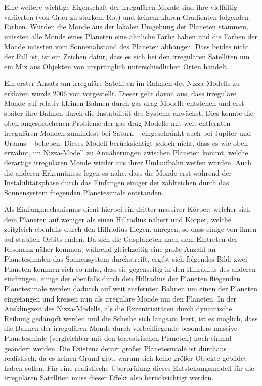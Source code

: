 \documentclass[12pt,a4paper,twoside]{article}
\renewcommand{\cite}{\citep}
\begin{document}
Eine weitere wichtige Eigenschaft der irregulären Monde sind ihre vielfältig variierten (von Grau zu starkem Rot) und keinem klaren Gradienten folgenden Farben. Würden die Monde aus der lokalen Umgebung der Planeten stammen, müssten alle Monde eines Planeten eine ähnliche Farbe haben und die Farben der Monde müssten vom Sonnenabstand des Planeten abhängen\cite{Degewij1980Icar,Cruikshank1980Icar,Dumas1998Icar, Sykes2000Icar,Brown2000AJ,Grav2003Icar,Grav2004ApJ,GravHolman2004ApJ,Porco2005Sci,Nesvorny2007}. Dass beides nicht der Fall ist, ist ein Zeichen dafür, dass es sich bei den irregulären Satelliten um ein Mix aus Objekten von ursprünglich unterschiedlichen Orten handelt.

Ein erster Ansatz um irreguläre Satelliten im Rahmen des Nizza-Modells zu erklären wurde 2006 von \cite{Cuk2006} vorgestellt. Dieser geht davon aus, dass irreguläre Monde auf relativ kleinen Bahnen durch \glqq gas-drag\grqq-Modelle entstehen und erst später ihre Bahnen durch die Instabilität des Systems anwächst. Dies konnte die oben angesprochenen Probleme der \glqq gas-drag\grqq-Modelle mit weit entfernten irregulären Monden zumindest bei Saturn – eingeschränkt auch bei Jupiter und Uranus – beheben\cite{Cuk2006}.
Dieses Modell berücksichtigt jedoch nicht, dass es wie oben erwähnt, im Nizza-Modell zu Annäherungen zwischen Planeten kommt, welche derartige irregulären Monde wieder aus ihrer Umlaufbahn werfen würden. Auch die anderen Erkenntnisse legen es nahe, dass die Monde erst während der Instabilitätsphase durch das Einfangen einiger der zahlreichen durch das Sonnensystem fliegenden Planetesimale entstanden.

Als Einfangmechanismus dient hierbei ein dritter massiver Körper,
welcher sich dem Planeten auf weniger als einen Hillradius nähert und Körper,
welche zeitgleich ebenfalls durch den Hillradius fliegen, anregen, so dass einige von ihnen auf stabilen Orbits enden.
Da sich die Gasplaneten nach dem Eintreten der Resonanz näher kommen, während gleichzeitig eine große Anzahl an Planetesimalen das Sonnensystem durchstreift,
ergibt sich folgendes Bild: zwei Planeten kommen sich so nahe, dass sie gegenseitig in den Hillradius des anderen eindringen,
einige der ebenfalls durch den Hillradius der Planeten fliegenden Planetesimale werden dadurch auf weit entfernten Bahnen um einen der Planeten eingefangen und kreisen nun als irreguläre Monde um den Planeten\cite{Nesvorny2007}.
In der Ausklingzeit des Nizza-Modells, als die Exzentrizitäten durch dynamische Reibung gedämpft werden und die Scheibe sich langsam leert, ist es möglich, dass die Bahnen der irregulären Monde durch vorbeifliegende besonders massive Planetesmiale (vergleichbar mit den terrestrischen Planeten) noch einmal geändert werden.
Die Existenz derart großer Planetesmiale ist durchaus realistisch, da es keinen Grund gibt, warum sich keine größer Objekte gebildet haben sollen\cite{Nesvorny2007}. Für eine realistische Überprüfung dieses Entstehungsmodell für die irregulären Satelliten muss dieser Effekt also berücksichtigt werden.
\end{document}
